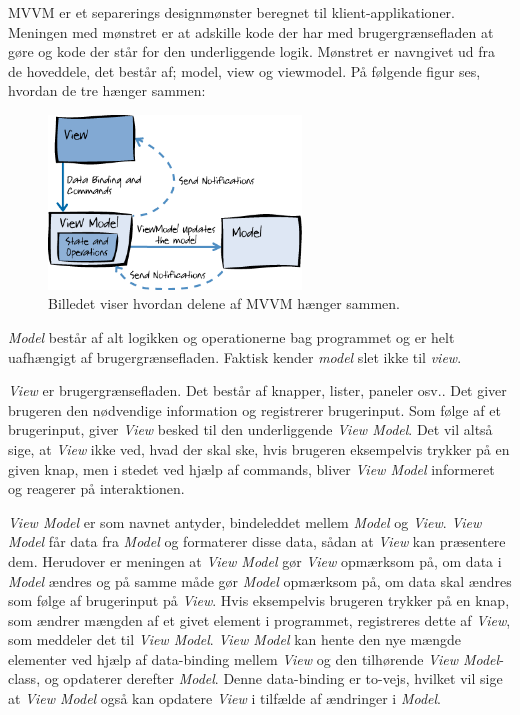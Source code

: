 MVVM er et separerings designmønster beregnet til klient-applikationer. Meningen med mønstret er at adskille kode der har med brugergrænsefladen at gøre og kode der står for den underliggende logik. Mønstret er navngivet ud fra de hoveddele, det består af; model, view og viewmodel. På følgende figur ses, hvordan de tre hænger sammen:

\begin{figure}[H]
\centering
\includegraphics[width=0.6\textwidth]{Billeder/MVVM.png}
\caption{Billedet viser hvordan delene af MVVM hænger sammen.\cite{msdn1}}
\label{MVVM1}
\end{figure}

\textit{Model} består af alt logikken og operationerne bag programmet og er helt uafhængigt af brugergrænsefladen. Faktisk kender \textit{model} slet ikke til \textit{view}.

\textit{View} er brugergrænsefladen. Det består af knapper, lister, paneler osv.. Det giver brugeren den nødvendige information og registrerer brugerinput. Som følge af et brugerinput, giver \textit{View} besked til den underliggende \textit{View Model}. Det vil altså sige, at \textit{View} ikke ved, hvad der skal ske, hvis brugeren eksempelvis trykker på en given knap, men i stedet ved hjælp af commands, bliver \textit{View Model} informeret og reagerer på interaktionen.  

\textit{View Model} er som navnet antyder, bindeleddet mellem \textit{Model} og \textit{View}. \textit{View Model} får data fra \textit{Model} og formaterer disse data, sådan at \textit{View} kan præsentere dem. Herudover er meningen at \textit{View Model} gør \textit{View} opmærksom på, om data i \textit{Model} ændres og på samme måde gør \textit{Model} opmærksom på, om data skal ændres som følge af brugerinput på \textit{View}. Hvis eksempelvis brugeren trykker på en knap, som ændrer mængden af et givet element i programmet, registreres dette af \textit{View}, som meddeler det til \textit{View Model}. \textit{View Model} kan hente den nye mængde elementer ved hjælp af data-binding mellem \textit{View} og den tilhørende \textit{View Model}-class, og opdaterer derefter \textit{Model}. Denne data-binding er to-vejs, hvilket vil sige at \textit{View Model} også kan opdatere \textit{View} i tilfælde af ændringer i \textit{Model}.

